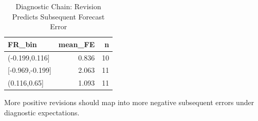 \begin{table}[!htbp]
    \centering
    \caption{Diagnostic Chain: Revision Predicts Subsequent Forecast Error}
    \label{tab:revision_predicts_error}
    \begin{threeparttable}

        \begin{tabular}{lrr}
            \toprule
            FR\_bin           & mean\_FE & n  \\
            \midrule
            (-0.199,0.116]    & 0.836    & 10 \\
            {}[-0.969,-0.199] & 2.063    & 11 \\
            (0.116,0.65]      & 1.093    & 11 \\
            \bottomrule
        \end{tabular}
        \begin{tablenotes}[flushleft]
            \footnotesize
            \item More positive revisions should map into more negative subsequent errors under diagnostic expectations.
        \end{tablenotes}
    \end{threeparttable}
\end{table}
